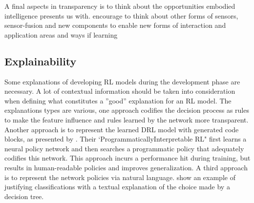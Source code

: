 \documentclass[twoside,11pt]{article}
\begin{document}
A final aspects in transparency is to think about the opportunities embodied intelligence presents us with. \citet{RoyEtAl:2021:RLRoboticsChallenges} encourage to think about other forms of sensors, sensor-fusion and new components to enable new forms of interaction and application areas and ways if learning

\subsection{Explainability}
Some explanations of developing RL models during the development phase are necessary. A lot of contextual information should be taken into consideration when defining what constitutes a ”good” explanation for an RL model. The explanations types are various, one approach \citet{LiuEtAl:2018:LinearModelUTrees} codifies the decision process as rules to make the feature influence and rules learned by the network more transparent. Another approach is to represent the learned DRL model with generated code blocks, as presented by \citet{VermaEtAl:2018:ProgrammaticallyInterpretableRL}. Their `ProgrammaticallyInterpretable RL" first learns a neural policy network and then searches a programmatic policy that adequately codifies this network. This approach incurs a performance hit during training, but results in human-readable policies and improves generalization.  A third approach is to represent the network policies via natural language. \citet{AlonsoEtAl:2018:xAINLBeerClassifier} show an example of justifying classifications with a textual explanation of the choice made by a decision tree.


\end{document}
